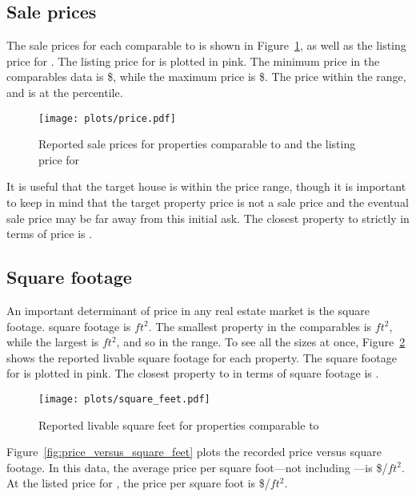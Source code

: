 \documentclass[
12pt, %
letterpaper, %
oneside, %
headinclude,footinclude, %
BCOR5mm, %
]{scrartcl}
\begin{document}
\subsection{Sale prices} 
The sale prices for each comparable to \PropertyName{} is shown in Figure~\ref{fig:price}, as well as the listing price for \PropertyName{}. 
The listing price for \PropertyName{} is plotted in pink. 
The minimum price in the comparables data is \$\MinPrice{}, while the maximum price is \$\MaxPrice{}.
The \PropertyName{} price \InPriceRange{} within the range, and is at the \PricePercentile{} percentile.

\begin{figure}[h!]
\centering
\caption{Reported sale prices for properties comparable to \PropertyName{} and the listing price for \PropertyName{}} \label{fig:price}  
\texttt{[image: plots/price.pdf]} 
\end{figure}

It is useful that the target house is within the price range, though it is important to keep in mind that the target property price is not a sale price and the eventual sale price may be far away from this initial ask. 
The closest property to \PropertyName{} strictly in terms of price is \ClosestOnPrice{}. 

\subsection{Square footage}
An important determinant of price in any real estate market is the square footage.
\PropertyName{} square footage is \PropertySize{} $ft^2$.
The smallest property in the comparables is \MinSize{}$ft^2$, while the largest is \MaxSize{}$ft^2$, and so \PropertyName{} \InSizeRange{} in the range. 
To see all the sizes at once, Figure~\ref{fig:square_feet} shows the reported livable square footage for each property.
The square footage for \PropertyName{} is plotted in pink. 
The closest property to \PropertyName{} in terms of square footage is \ClosestOnSize{}.

\begin{figure}[h!]
\centering
\caption{Reported livable square feet for properties comparable to \PropertyName{}} \label{fig:square_feet}  
\texttt{[image: plots/square\_feet.pdf]} 
\end{figure}

Figure~\ref{fig:price_versus_square_feet} plots the recorded price versus square footage.
In this data, the average price per square foot---not including \PropertyName{}---is \$\MeanPricePerFoot{}/$ft^2$.
At the listed price for \PropertyName{}, the price per square foot is \$\MeanPricePerFootFocal{}/$ft^2$.
\end{document}
